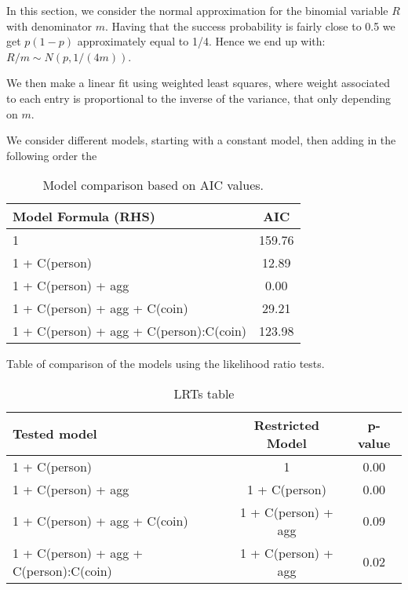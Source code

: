 \documentclass[a4paper, 12pt,oneside]{article}
\begin{document}
			In this section, we consider the normal approximation for the binomial variable $R$ with denominator $m$. Having that the success probability is fairly close to 0.5 we get $p(1-p)$ approximately equal to 1/4. Hence we end up with: $R/m \sim N(p,1/(4m))$. 

			We then make a linear fit using weighted least squares, where  weight associated to each entry is proportional to the inverse of the variance, that only depending on $m$.

			We consider different models, starting with a constant model, then adding in the following order the 

			\begin{table}[htb]
				\centering
				\caption{Model comparison based on AIC values.}
				\label{tab:model-comparison}
				\begin{tabular}{lc}
				\toprule
				Model Formula (RHS) & AIC \\
				\midrule
				1 & 159.76 \\
				1 + C(person) & 12.89 \\
				1 + C(person) + agg & 0.00 \\
				1 + C(person) + agg + C(coin) & 29.21 \\
				1 + C(person) + agg + C(person):C(coin) & 123.98 \\
				\bottomrule
				\end{tabular}
				\end{table}



			Table of comparison of the models using the likelihood ratio tests. 

			\begin{table}[htb]
				\caption{LRTs table}
				\label{tab:LRT-model-comparison}
				\begin{tabular}{lcc}
				\toprule
				Tested model & Restricted Model & p-value \\
				\midrule
				1 + C(person) & 1 & 0.00 \\
				1 + C(person) + agg & 1 + C(person) & 0.00 \\
				1 + C(person) + agg + C(coin) & 1 + C(person) + agg & 0.09 \\
				1 + C(person) + agg + C(person):C(coin) & 1 + C(person) + agg & 0.02 \\
				\bottomrule
				\end{tabular}
				\end{table}
\end{document}
